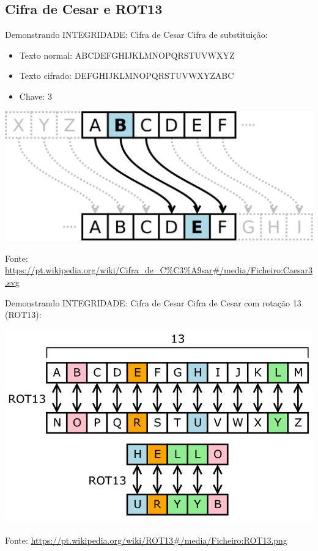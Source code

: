 \documentclass[xcolor=dvipsnames,table]{beamer}
\begin{document}
\subsection{Cifra de Cesar e ROT13}
\begin{frame}{Demonstrando INTEGRIDADE: Cifra de Cesar}
	Cifra de substituição:
	\begin{itemize}
		\item Texto normal: ABCDEFGHIJKLMNOPQRSTUVWXYZ
		\item Texto cifrado: DEFGHIJKLMNOPQRSTUVWXYZABC
		\item Chave: 3
	\end{itemize}
	\begin{center}
		\includegraphics[scale=0.1]{cifra-cesar.png}
	\end{center}
	Fonte: \url{https://pt.wikipedia.org/wiki/Cifra_de_C\%C3\%A9sar\#/media/Ficheiro:Caesar3.svg}
\end{frame}

\begin{frame}{Demonstrando INTEGRIDADE: Cifra de Cesar}
	Cifra de Cesar com rotação 13 (ROT13):
	\begin{center}
		\includegraphics[scale=0.3]{ROT13.png}
	\end{center}
	Fonte: \url{https://pt.wikipedia.org/wiki/ROT13\#/media/Ficheiro:ROT13.png}
\end{frame}
\end{document}
